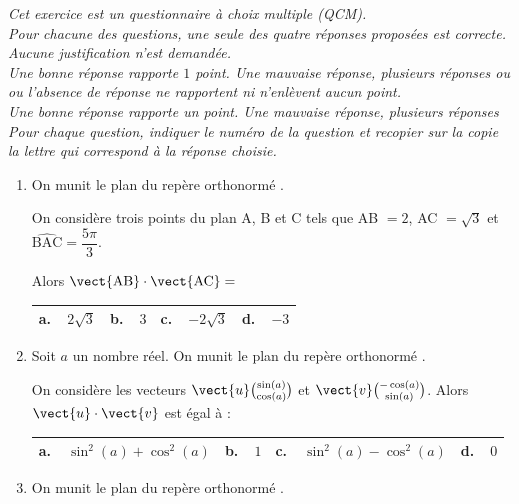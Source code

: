 \emph{Cet exercice est un questionnaire à choix multiple (QCM).\\
Pour chacune des questions, une seule des quatre réponses proposées est correcte.\\
Aucune justification n'est demandée.\\
Une bonne  réponse  rapporte $1$ point. Une mauvaise réponse, plusieurs réponses  ou ou l'absence de réponse ne rapportent ni n'enlèvent aucun point.\\
Une bonne réponse rapporte un point. Une mauvaise réponse, plusieurs réponses 
Pour chaque question, indiquer le numéro de la question et recopier sur la copie la lettre qui correspond à la réponse choisie.}


\medskip

\begin{enumerate}
\item On munit le plan du repère orthonormé \Oij.

On considère trois points du plan A, B et C tels que AB $= 2$, AC $= \sqrt{3}$ et $\widehat{\text{BAC}} = \dfrac{5\pi}{3}$.

Alors $\vect{\text{AB}} \cdot \vect{\text{AC}} = $

\begin{center}
\begin{tabularx}{\linewidth}{|*{4}{X|}}\hline
\textbf{a.~~}$2\sqrt{3}$ &\textbf{b.~~}$3$&\textbf{c.~~}$- 2\sqrt{3}$  &\textbf{d.~~}$ - 3$\\ \hline
\end{tabularx}
\end{center}

\item Soit $a$ un nombre réel. On munit le plan du repère orthonormé \Oij.

On considère les vecteurs $\vect{u}\binom{\sin (a)}{\cos (a)}$ et $\vect{v}\binom{-\cos (a)}{\sin (a)}$. Alors $\vect{u} \cdot \vect{v}$ est égal à :

\begin{center}
\begin{tabularx}{\linewidth}{|*{4}{X|}}\hline
\textbf{a.~~}$\sin^2 (a)+\cos^2 (a)$ &\textbf{b.~~}$1$&\textbf{c.~~}$\sin^2 (a)-\cos^2 (a)$  &\textbf{d.~~}$0$\\ \hline
\end{tabularx}
\end{center}

\item On munit le plan du repère orthonormé \Oij.


\end{enumerate}
